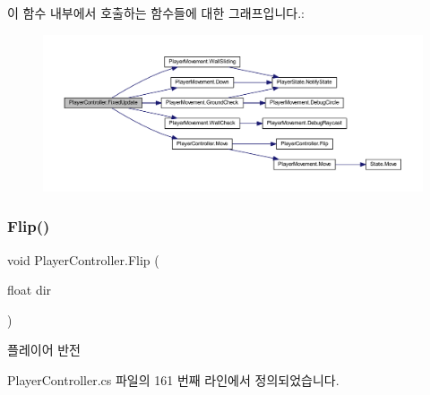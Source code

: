 이 함수 내부에서 호출하는 함수들에 대한 그래프입니다.\+:
\nopagebreak
\begin{figure}[H]
\begin{center}
\leavevmode
\includegraphics[width=350pt]{dc/dde/class_player_controller_ae5bdb1b48571f67c3f722a58b6f404d4_cgraph}
\end{center}
\end{figure}
\mbox{\label{class_player_controller_a4cc61bc6a9187892458138a1d0ffc207}} 
\subsubsection{\texorpdfstring{Flip()}{Flip()}}
{\footnotesize\ttfamily void Player\+Controller.\+Flip (\begin{DoxyParamCaption}\item[{float}]{dir }\end{DoxyParamCaption})}



플레이어 반전 



Player\+Controller.\+cs 파일의 161 번째 라인에서 정의되었습니다.


